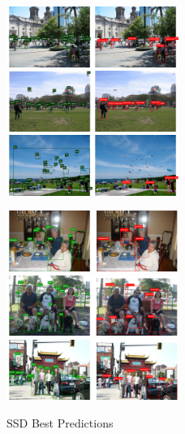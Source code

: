 \documentclass[12pt]{article}
\begin{document}
\begin{figure}[htbp]
    {\raggedright
    \includegraphics[width=0.5\textwidth]{images/ssd_res/ssd_b1.png}
    \includegraphics[width=0.5\textwidth]{images/ssd_res/ssd_b2.png}
    \includegraphics[width=0.5\textwidth]{images/ssd_res/ssd_b3.png}}
    {\raggedleft
    \includegraphics[width=0.5\textwidth]{images/ssd_res/ssd_b4.png}
    \includegraphics[width=0.5\textwidth]{images/ssd_res/ssd_b5.png}
    \includegraphics[width=0.5\textwidth]{images/ssd_res/ssd_b6.png}}
    \caption{SSD Best Predictions}
    \label{fig:ssd5}
\end{figure}
\end{document}
